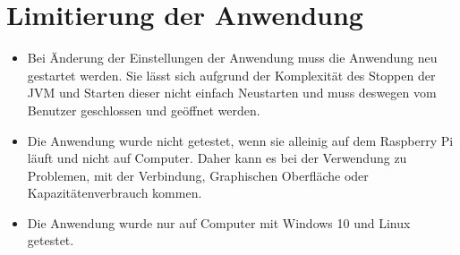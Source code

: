 \documentclass[parskip=full]{scrartcl}
\begin{document}
\section{Limitierung der Anwendung}

\begin{itemize}

\item Bei Änderung der Einstellungen der Anwendung muss die Anwendung neu gestartet werden. Sie lässt sich aufgrund der Komplexität des Stoppen der JVM und Starten dieser nicht einfach Neustarten und muss deswegen vom Benutzer geschlossen und geöffnet werden.

\item Die Anwendung wurde nicht getestet, wenn sie alleinig auf dem Raspberry Pi läuft und nicht auf Computer. Daher kann es bei der Verwendung zu Problemen, mit der Verbindung, Graphischen Oberfläche oder Kapazitätenverbrauch kommen.

\item Die Anwendung wurde nur auf Computer mit Windows 10 und Linux getestet.

\end{itemize}

\printnoidxglossaries				%
\end{document}
